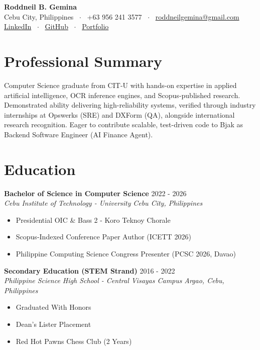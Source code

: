 \documentclass[letterpaper,10pt]{article}
\begin{document}
\begin{center}
    {\LARGE \textbf{Roddneil B. Gemina}} \\ \vspace{2pt}
    \small Cebu City, Philippines \ $\cdot$ \ +63 956 241 3577 \ $\cdot$ \ \href{mailto:roddneilgemina@gmail.com}{roddneilgemina@gmail.com} \\ \vspace{2pt}
    \href{https://www.linkedin.com/in/roddneil-gemina-20b423409}{LinkedIn} \ $\cdot$ \ \href{https://github.com/RoddneilGemina}{GitHub} \ $\cdot$ \ \href{https://roddneilgemina.github.io}{Portfolio}
\end{center}

\vspace{-4pt}
\section{Professional Summary}
Computer Science graduate from CIT-U with hands-on expertise in applied artificial intelligence, OCR inference engines, and Scopus-published research. Demonstrated ability delivering high-reliability systems, verified through industry internships at Opswerks (SRE) and DXForm (QA), alongside international research recognition. Eager to contribute scalable, test-driven code to Bjak as Backend Software Engineer (AI Finance Agent).

\section{Education}
\textbf{Bachelor of Science in Computer Science} \hfill 2022 - 2026
\\ \textit{Cebu Institute of Technology - University} \hfill \textit{Cebu City, Philippines}
\begin{itemize}
  \item Presidential OIC \& Bass 2 - Koro Teknoy Chorale
  \item Scopus-Indexed Conference Paper Author (ICETT 2026)
  \item Philippine Computing Science Congress Presenter (PCSC 2026, Davao)
\end{itemize}
\vspace{4pt}
\textbf{Secondary Education (STEM Strand)} \hfill 2016 - 2022
\\ \textit{Philippine Science High School - Central Visayas Campus} \hfill \textit{Argao, Cebu, Philippines}
\begin{itemize}
  \item Graduated With Honors
  \item Dean's Lister Placement
  \item Red Hot Pawns Chess Club (2 Years)
\end{itemize}
\vspace{4pt}
\end{document}
